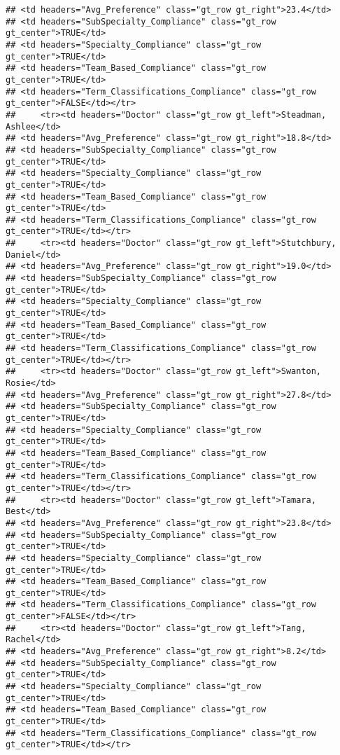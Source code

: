 \documentclass[
]{article}
\begin{document}
\begin{verbatim}
## <td headers="Avg_Preference" class="gt_row gt_right">23.4</td>
## <td headers="SubSpecialty_Compliance" class="gt_row gt_center">TRUE</td>
## <td headers="Specialty_Compliance" class="gt_row gt_center">TRUE</td>
## <td headers="Team_Based_Compliance" class="gt_row gt_center">TRUE</td>
## <td headers="Term_Classifications_Compliance" class="gt_row gt_center">FALSE</td></tr>
##     <tr><td headers="Doctor" class="gt_row gt_left">Steadman, Ashlee</td>
## <td headers="Avg_Preference" class="gt_row gt_right">18.8</td>
## <td headers="SubSpecialty_Compliance" class="gt_row gt_center">TRUE</td>
## <td headers="Specialty_Compliance" class="gt_row gt_center">TRUE</td>
## <td headers="Team_Based_Compliance" class="gt_row gt_center">TRUE</td>
## <td headers="Term_Classifications_Compliance" class="gt_row gt_center">TRUE</td></tr>
##     <tr><td headers="Doctor" class="gt_row gt_left">Stutchbury, Daniel</td>
## <td headers="Avg_Preference" class="gt_row gt_right">19.0</td>
## <td headers="SubSpecialty_Compliance" class="gt_row gt_center">TRUE</td>
## <td headers="Specialty_Compliance" class="gt_row gt_center">TRUE</td>
## <td headers="Team_Based_Compliance" class="gt_row gt_center">TRUE</td>
## <td headers="Term_Classifications_Compliance" class="gt_row gt_center">TRUE</td></tr>
##     <tr><td headers="Doctor" class="gt_row gt_left">Swanton, Rosie</td>
## <td headers="Avg_Preference" class="gt_row gt_right">27.8</td>
## <td headers="SubSpecialty_Compliance" class="gt_row gt_center">TRUE</td>
## <td headers="Specialty_Compliance" class="gt_row gt_center">TRUE</td>
## <td headers="Team_Based_Compliance" class="gt_row gt_center">TRUE</td>
## <td headers="Term_Classifications_Compliance" class="gt_row gt_center">TRUE</td></tr>
##     <tr><td headers="Doctor" class="gt_row gt_left">Tamara, Best</td>
## <td headers="Avg_Preference" class="gt_row gt_right">23.8</td>
## <td headers="SubSpecialty_Compliance" class="gt_row gt_center">TRUE</td>
## <td headers="Specialty_Compliance" class="gt_row gt_center">TRUE</td>
## <td headers="Team_Based_Compliance" class="gt_row gt_center">TRUE</td>
## <td headers="Term_Classifications_Compliance" class="gt_row gt_center">FALSE</td></tr>
##     <tr><td headers="Doctor" class="gt_row gt_left">Tang, Rachel</td>
## <td headers="Avg_Preference" class="gt_row gt_right">8.2</td>
## <td headers="SubSpecialty_Compliance" class="gt_row gt_center">TRUE</td>
## <td headers="Specialty_Compliance" class="gt_row gt_center">TRUE</td>
## <td headers="Team_Based_Compliance" class="gt_row gt_center">TRUE</td>
## <td headers="Term_Classifications_Compliance" class="gt_row gt_center">TRUE</td></tr>

\end{verbatim}
\end{document}
